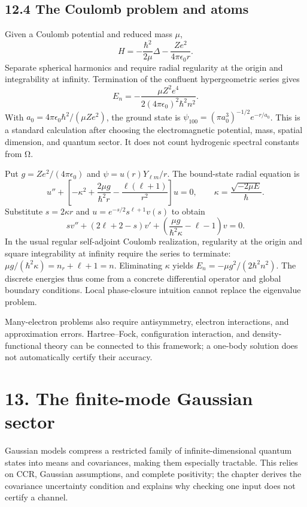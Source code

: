 \documentclass[
  11pt,
  oneside]{book}
\begin{document}
\section{12.4 The Coulomb problem and atoms}

Given a Coulomb potential and reduced mass \(\mu\), \[
H=-\frac{\hbar^2}{2\mu}\Delta-\frac{Ze^2}{4\pi\epsilon_0r}.
\] Separate spherical harmonics and require radial regularity at the
origin and integrability at infinity. Termination of the confluent
hypergeometric series gives \[
E_n=-\frac{\mu Z^2e^4}{2(4\pi\epsilon_0)^2\hbar^2n^2}.
\] With \(a_0=4\pi\epsilon_0\hbar^2/(\mu Ze^2)\), the ground state is
\(\psi_{100}=(\pi a_0^3)^{-1/2}e^{-r/a_0}\). This is a standard
calculation after choosing the electromagnetic potential, mass, spatial
dimension, and quantum sector. It does not count hydrogenic spectral
constants from Ω.

Put \(g=Ze^2/(4\pi\epsilon_0)\) and \(\psi=u(r)Y_{\ell m}/r\). The
bound-state radial equation is \[
u''+\left[-\kappa^2+\frac{2\mu g}{\hbar^2r}
-\frac{\ell(\ell+1)}{r^2}\right]u=0,
\qquad \kappa=\frac{\sqrt{-2\mu E}}{\hbar}.
\] Substitute \(s=2\kappa r\) and \(u=e^{-s/2}s^{\ell+1}v(s)\) to obtain
\[
s v''+(2\ell+2-s)v'+\left(\frac{\mu g}{\hbar^2\kappa}-\ell-1\right)v=0.
\] In the usual regular self-adjoint Coulomb realization, regularity at
the origin and square integrability at infinity require the series to
terminate: \(\mu g/(\hbar^2\kappa)=n_r+\ell+1=n\). Eliminating
\(\kappa\) yields \(E_n=-\mu g^2/(2\hbar^2n^2)\). The discrete energies
thus come from a concrete differential operator and global boundary
conditions. Local phase-closure intuition cannot replace the eigenvalue
problem.

Many-electron problems also require antisymmetry, electron interactions,
and approximation errors. Hartree--Fock, configuration interaction, and
density-functional theory can be connected to this framework; a one-body
solution does not automatically certify their accuracy.

\chapter{13. The finite-mode Gaussian sector}\label{ch-13}

Gaussian models compress a restricted family of infinite-dimensional
quantum states into means and covariances, making them especially
tractable. This relies on CCR, Gaussian assumptions, and complete
positivity; the chapter derives the covariance uncertainty condition and
explains why checking one input does not certify a channel.
\end{document}
